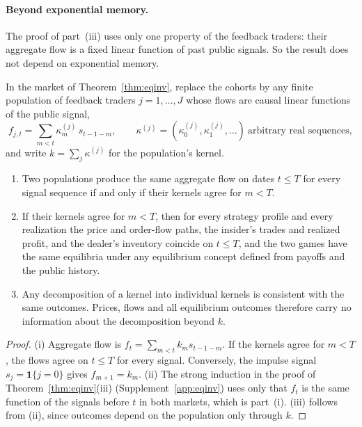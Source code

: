 
\paragraph{Beyond exponential memory.} The proof of part~(iii) uses only one property of the feedback traders: their aggregate flow is a fixed linear function of past public signals. So the result does not depend on exponential memory.

\begin{proposition}\label{prop:anylinear}
In the market of Theorem~\ref{thm:eqinv}, replace the cohorts by any finite population of feedback traders $j=1,\ldots,J$ whose flows are causal linear functions of the public signal,
\[
 f_{j,t}=\sum_{m<t}\kappa^{(j)}_m\,s_{t-1-m},\qquad \kappa^{(j)}=(\kappa^{(j)}_0,\kappa^{(j)}_1,\ldots)\ \text{arbitrary real sequences},
\]
and write $k=\sum_j\kappa^{(j)}$ for the population's kernel.
\begin{enumerate}[label=(\roman*),itemsep=1pt]
\item Two populations produce the same aggregate flow on dates $t\le T$ for every signal sequence if and only if their kernels agree for $m<T$.
\item If their kernels agree for $m<T$, then for every strategy profile and every realization the price and order-flow paths, the insider's trades and realized profit, and the dealer's inventory coincide on $t\le T$, and the two games have the same equilibria under any equilibrium concept defined from payoffs and the public history.
\item Any decomposition of a kernel into individual kernels is consistent with the same outcomes. Prices, flows and all equilibrium outcomes therefore carry no information about the decomposition beyond $k$.
\end{enumerate}
\end{proposition}

\begin{proof}
(i) Aggregate flow is $f_t=\sum_{m<t}k_ms_{t-1-m}$. If the kernels agree for $m<T$, the flows agree on $t\le T$ for every signal. Conversely, the impulse signal $s_j=\mathbf 1\{j=0\}$ gives $f_{m+1}=k_m$. (ii) The strong induction in the proof of Theorem~\ref{thm:eqinv}(iii) (Supplement~\ref{app:eqinv}) uses only that $f_t$ is the same function of the signals before $t$ in both markets, which is part~(i). (iii) follows from (ii), since outcomes depend on the population only through $k$.
\end{proof}

